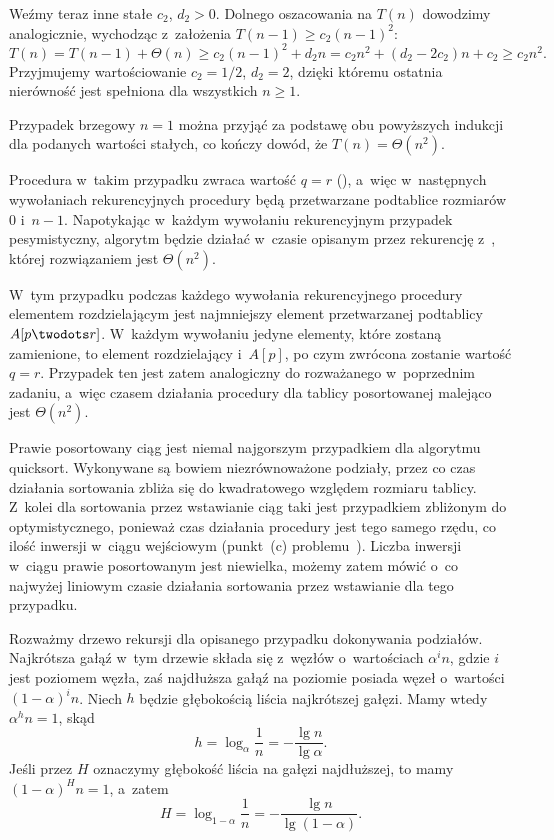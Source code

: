 Weźmy teraz inne stałe $c_2$, $d_2>0$. Dolnego oszacowania na $T(n)$ dowodzimy analogicznie, wychodząc z~założenia $T(n-1)\ge c_2(n-1)^2$:
\[
	T(n) = T(n-1)+\Theta(n) \ge c_2(n-1)^2+d_2n = c_2n^2+(d_2-2c_2)n+c_2 \ge c_2n^2.
\]
Przyjmujemy wartościowanie $c_2=1/2$, $d_2=2$, dzięki któremu ostatnia nierówność jest spełniona dla wszystkich $n\ge1$.

Przypadek brzegowy $n=1$ można przyjąć za podstawę obu powyższych indukcji dla podanych wartości stałych, co kończy dowód, że $T(n)=\Theta(n^2)$.

\exercise %
Procedura  w~takim przypadku zwraca wartość $q=r$ (), a~więc w~następnych wywołaniach rekurencyjnych procedury  będą przetwarzane podtablice rozmiarów 0 i~$n-1$. Napotykając w~każdym wywołaniu rekurencyjnym przypadek pesymistyczny, algorytm będzie działać w~czasie opisanym przez rekurencję z~, której rozwiązaniem jest $\Theta(n^2)$.

\exercise %
W~tym przypadku podczas każdego wywołania rekurencyjnego procedury  elementem rozdzielającym jest najmniejszy element przetwarzanej podtablicy $A[p\twodots r]$. W~każdym wywołaniu jedyne elementy, które zostaną zamienione, to element rozdzielający i~$A[p]$, po czym zwrócona zostanie wartość $q=r$. Przypadek ten jest zatem analogiczny do rozważanego w~poprzednim zadaniu, a~więc czasem działania procedury  dla tablicy posortowanej malejąco jest $\Theta(n^2)$.

\exercise %
Prawie posortowany ciąg jest niemal najgorszym przypadkiem dla algorytmu quicksort. Wykonywane są bowiem niezrównoważone podziały, przez co czas działania sortowania zbliża się do kwadratowego względem rozmiaru tablicy. Z~kolei dla sortowania przez wstawianie ciąg taki jest przypadkiem zbliżonym do optymistycznego, ponieważ czas działania procedury  jest tego samego rzędu, co ilość inwersji w~ciągu wejściowym (punkt~(c) problemu~). Liczba inwersji w~ciągu prawie posortowanym jest niewielka, możemy zatem mówić o~co najwyżej liniowym czasie działania sortowania przez wstawianie dla tego przypadku.

\exercise %
Rozważmy drzewo rekursji dla opisanego przypadku dokonywania podziałów. Najkrótsza gałąź w~tym drzewie składa się z~węzłów o~wartościach $\alpha^in$, gdzie $i$ jest poziomem węzła, zaś najdłuższa gałąź na  poziomie posiada węzeł o~wartości $(1-\alpha)^in$. Niech $h$ będzie głębokością liścia najkrótszej gałęzi. Mamy wtedy $\alpha^hn=1$, skąd
\[
	h = \log_\alpha\frac{1}{n} = -\frac{\lg n}{\lg\alpha}.
\]
Jeśli przez $H$ oznaczymy głębokość liścia na gałęzi najdłuższej, to mamy $(1-\alpha)^Hn=1$, a~zatem
\[
	H = \log_{1-\alpha}\frac{1}{n} = -\frac{\lg n}{\lg(1-\alpha)}.
\]


